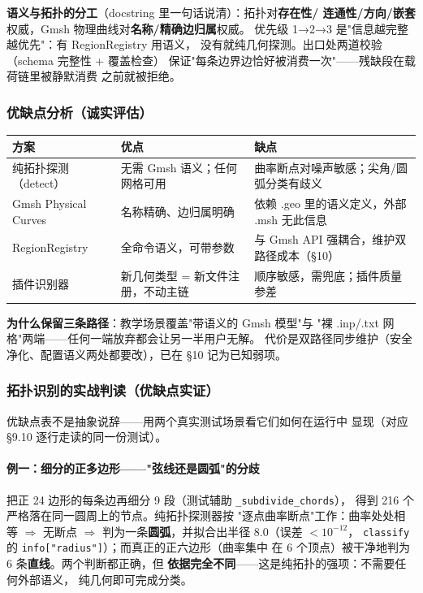 \documentclass[12pt,a4paper]{ctexart}
\newcommand{\fem}{\Verb}
\begin{document}
\textbf{语义与拓扑的分工}（docstring 里一句话说清）：拓扑对\textbf{存在性/
连通性/方向/嵌套}权威，Gmsh 物理曲线对\textbf{名称/精确边归属}权威。
优先级 1→2→3 是"信息越完整越优先"：有 RegionRegistry 用语义，
没有就纯几何探测。出口处两道校验（schema 完整性 + 覆盖检查）
保证"每条边界边恰好被消费一次"——残缺段在载荷链里被静默消费
之前就被拒绝。

\subsubsection{优缺点分析（诚实评估）}

\begin{table}[h]
\centering
\small
\begin{tabular}{p{4.4cm}p{5.6cm}p{5.0cm}}
\toprule
\textbf{方案} & \textbf{优点} & \textbf{缺点} \\
\midrule
纯拓扑探测（detect） & 无需 Gmsh 语义；任何网格可用 & 曲率断点对噪声敏感；尖角/圆弧分类有歧义 \\
Gmsh Physical Curves & 名称精确、边归属明确 & 依赖 .geo 里的语义定义，外部 .msh 无此信息 \\
RegionRegistry & 全命令语义，可带参数 & 与 Gmsh API 强耦合，维护双路径成本（§10） \\
插件识别器 & 新几何类型 = 新文件注册，不动主链 & 顺序敏感，需兜底；插件质量参差 \\
\bottomrule
\end{tabular}
\end{table}

\textbf{为什么保留三条路径}：教学场景覆盖"带语义的 Gmsh 模型"与
"裸 .inp/.txt 网格"两端——任何一端放弃都会让另一半用户无解。
代价是双路径同步维护（安全净化、配置语义两处都要改），已在
§10 记为已知弱项。

\subsubsection{拓扑识别的实战判读（优缺点实证）}

优缺点表不是抽象说辞——用两个真实测试场景看它们如何在运行中
显现（对应 §9.10 逐行走读的同一份测试）。

\paragraph{例一：细分的正多边形——"弦线还是圆弧"的分歧}

把正 24 边形的每条边再细分 9 段（测试辅助 \fem|_subdivide_chords|），
得到 216 个严格落在同一圆周上的节点。纯拓扑探测器按
"逐点曲率断点"工作：曲率处处相等 $\Rightarrow$ 无断点 $\Rightarrow$
判为一条\textbf{圆弧}，并拟合出半径 $8.0$（误差 $<10^{-12}$，
\fem|classify| 的 \fem|info["radius"]|）；而真正的正六边形（曲率集中
在 6 个顶点）被干净地判为 6 条\textbf{直线}。两个判断都正确，但
\textbf{依据完全不同}——这是纯拓扑的强项：不需要任何外部语义，
纯几何即可完成分类。
\end{document}
